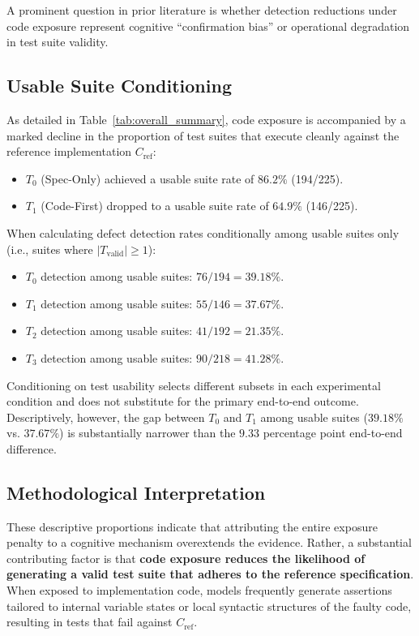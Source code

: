 \documentclass[11pt,a4paper]{article}
\begin{document}
A prominent question in prior literature is whether detection reductions under code exposure represent cognitive ``confirmation bias'' or operational degradation in test suite validity.

\subsection{Usable Suite Conditioning}
As detailed in Table~\ref{tab:overall_summary}, code exposure is accompanied by a marked decline in the proportion of test suites that execute cleanly against the reference implementation $C_{\text{ref}}$:
\begin{itemize}
    \item $T_0$ (Spec-Only) achieved a usable suite rate of \textbf{$86.2\%$} (194/225).
    \item $T_1$ (Code-First) dropped to a usable suite rate of \textbf{$64.9\%$} (146/225).
\end{itemize}

When calculating defect detection rates conditionally among usable suites only (i.e., suites where $|T_{\text{valid}}| \ge 1$):
\begin{itemize}
    \item $T_0$ detection among usable suites: $76 / 194 = \mathbf{39.18\%}$.
    \item $T_1$ detection among usable suites: $55 / 146 = \mathbf{37.67\%}$.
    \item $T_2$ detection among usable suites: $41 / 192 = \mathbf{21.35\%}$.
    \item $T_3$ detection among usable suites: $90 / 218 = \mathbf{41.28\%}$.
\end{itemize}

Conditioning on test usability selects different subsets in each experimental condition and does not substitute for the primary end-to-end outcome. Descriptively, however, the gap between $T_0$ and $T_1$ among usable suites ($39.18\%$ vs. $37.67\%$) is substantially narrower than the $9.33$ percentage point end-to-end difference.

\subsection{Methodological Interpretation}
These descriptive proportions indicate that attributing the entire exposure penalty to a cognitive mechanism overextends the evidence. Rather, a substantial contributing factor is that \textbf{code exposure reduces the likelihood of generating a valid test suite that adheres to the reference specification}. When exposed to implementation code, models frequently generate assertions tailored to internal variable states or local syntactic structures of the faulty code, resulting in tests that fail against $C_{\text{ref}}$. 
\end{document}
